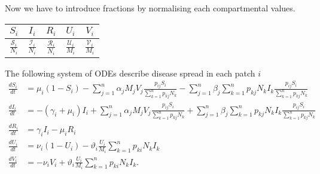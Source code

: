 \documentclass{article}
\begin{document}
Now we have to introduce fractions by normalising each compartmental values. 
\begin{center}
	\begin{tabular}{c c c c c}
		${S}_i$&${I}_i$ &${R}_i$&${U}_i$ &${V}_i$\\\hline\noalign{\smallskip} $\frac{\mathcal{S}_i}{N_i}$&$\frac{\mathcal{I}_i}{N_i}$&$\frac{\mathcal{R}_i}{N_i}$
		&$\frac{\mathcal{U}_i}{M_i}$&$\frac{\mathcal{V}_i}{M_i}$
	\end{tabular}
\end{center}
The following system of ODEs describe disease spread in each patch $i$
\begin{align*}
\frac{d{S}_{i}}{dt}&= \mu_i(1-{S}_i)-{\sum_{j=1}^{n}\alpha_jM_j{V}_j\frac{p_{ij}{S}_i}{\sum_{k=1}^n p_{kj}N_k}}-{\sum_{j=1}^{n}\beta_j\sum_{k=1}^{n} p_{kj}N_k{I}_k\frac{p_{ij}{S}_i}{\sum_{k=1}^n p_{kj}N_k}}\\
\frac{d{I}_{i}}{dt}&= -(\gamma_i+\mu_i){I}_i+{\sum_{j=1}^{n}\alpha_jM_j{V}_j\frac{p_{ij}{S}_i}{\sum_{k=1}^n p_{kj}N_k}}+{\sum_{j=1}^{n}\beta_j\sum_{k=1}^{n} p_{kj}N_k{I}_k\frac{p_{ij}{S}_i}{\sum_{k=1}^n p_{kj}N_k}}\\
\frac{d{R}_{i}}{dt}&= \gamma_i{I}_i-\mu_i{R}_i\\
\frac{d{U}_{i}}{dt}&= \nu_i(1-{U}_i)-\vartheta_i\frac{{U}_i}{M_i}{\sum_{k=1}^n p_{ki}N_k{I}_k}\\
\frac{d{V}_{i}}{dt}&= -\nu_i {V}_i+\vartheta_i\frac{{U}_i}{M_i}{\sum_{k=1}^n p_{ki}N_k{I}_k}.
\end{align*}
\end{document}
